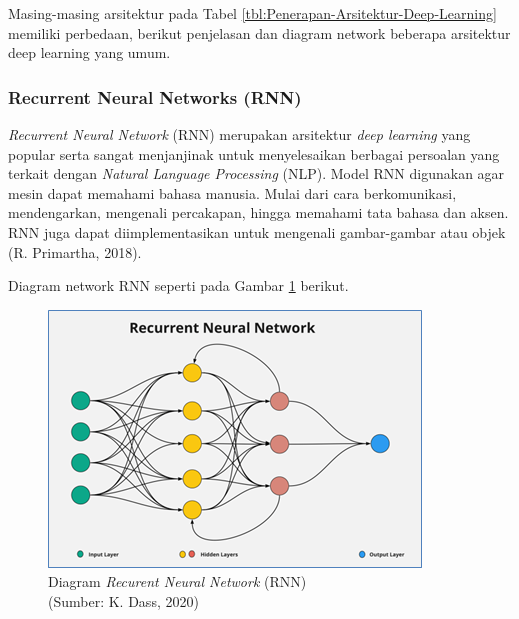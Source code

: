 Masing-masing arsitektur pada Tabel \ref{tbl:Penerapan-Arsitektur-Deep-Learning} memiliki perbedaan, berikut penjelasan dan diagram network beberapa arsitektur deep learning yang umum.

\subsubsection{Recurrent Neural Networks (RNN)}
\hspace{1,2cm}\textit{Recurrent Neural Network} (RNN) merupakan arsitektur \textit{deep learning} yang popular serta sangat menjanjinak untuk menyelesaikan berbagai persoalan yang terkait dengan \textit{Natural Language Processing} (NLP). Model RNN digunakan agar mesin dapat memahami bahasa manusia. Mulai dari cara berkomunikasi, mendengarkan, mengenali percakapan, hingga memahami tata bahasa dan aksen. RNN juga dapat diimplementasikan untuk mengenali gambar-gambar atau objek (R. Primartha, 2018).

Diagram network RNN seperti pada Gambar \ref{img:Diagram-RNN} berikut. 
\begin{figure}[H]
	\vspace{-0.1cm}
	\begin{center}
		\includegraphics[width=0.8\columnwidth]{bab2/Gambar/Picture14.png}
	\end{center}
	\vspace{-0.2cm}
	\captionsetup{justification=centering}
	\caption{Diagram \textit{Recurent Neural Network} (RNN)\\(Sumber: K. Dass, 2020)}\label{img:Diagram-RNN}
\end{figure}

